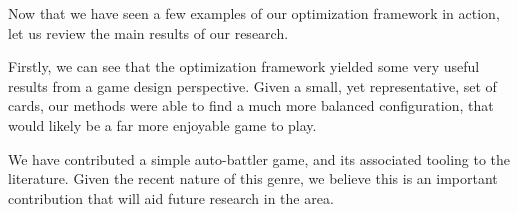 Now that we have seen a few examples of our optimization framework in action, let us review the main results of our research. 

Firstly, we can see that the optimization framework yielded some very useful results from a game design perspective. Given a small, yet representative, set of cards, our methods were able to find a much more balanced configuration, that would likely be a far more enjoyable game to play. 

We have contributed a simple auto-battler game, and its associated tooling to the literature. Given the recent nature of this genre, we believe this is an important contribution that will aid future research in the area.   